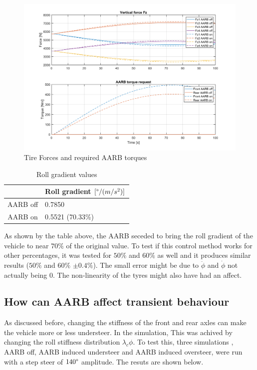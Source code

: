 \begin{figure}[H]
    \centering
    \includegraphics[width = \textwidth]{Figures/4_2_Fz.png}
    \caption{Tire Forces and required AARB torques}
\end{figure}

\begin{table}[H]
    \centering
    \begin{tabular}{c|l}
         & Roll gradient $[\degree/(m/s^2)]$ \\\hline
        AARB off & 0.7850 \\
        AARB on &   0.5521 (70.33\%)
    \end{tabular}
    \caption{Roll gradient values}
    \label{tab:my_label}
\end{table}

As shown by the table above, the AARB seceded to bring the roll gradient of the vehicle to near $70\%$ of the original value. To test if this control method works for other percentages, it was tested for $50\%$ and $60\%$ as well and it produces similar results ($50\%$ and $60\%$ $\pm 0.4\%$). The small error might be due to $\ddot{\phi}$ and $\dot{\phi}$ not actually being 0. The non-linearity of the tyres might also have had an affect. 

\subsection{How can AARB affect transient behaviour}

As discussed before, changing the stiffness of the front and rear axles can make the vehicle more or less understeer. In the simulation, This was achived by changing the roll stiffness distribution $\lambda_c\phi$. To test this, three  simulations , AARB off, AARB induced understeer and AARB induced oversteer, were run with a step steer of $140\degree$ amplitude.  The resuts are shown below.

